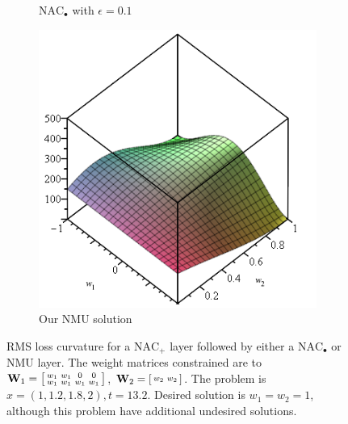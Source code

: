 \begin{figure}[h]
\begin{subfigure}{.33\textwidth}
  \caption{$\mathrm{NAC}_{\bullet}$ with $\epsilon = 0.1$}
\end{subfigure}
\begin{subfigure}{.33\textwidth}
  \centering
\includegraphics[width=\linewidth]{graphics/nac-mul-nmu.png}
  \caption{Our NMU solution}
\end{subfigure}

\caption{RMS loss curvature for a $\mathrm{NAC}_{+}$ layer followed by either a $\mathrm{NAC}_{\bullet}$ or NMU layer. The weight matrices constrained are to $\mathbf{W}_1 = \left[\protect\begin{smallmatrix}
w_1 & w_1 & 0 & 0 \\
w_1 & w_1 & w_1 & w_1
\protect\end{smallmatrix}\right]$, $\mathbf{W}_2 = \left[\protect\begin{smallmatrix}
w_2 & w_2
\protect\end{smallmatrix}\right]$. The problem is $x = \left(1, 1.2, 1.8, 2\right), t = 13.2$. Desired solution is $w_1 = w_2 = 1$, although this problem have additional undesired solutions.}
\label{fig:nac-mul-eps-issue}
\end{figure}

